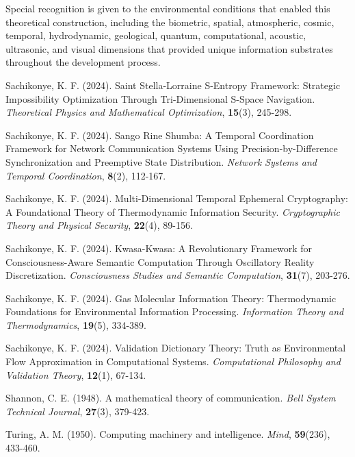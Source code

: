 \documentclass[12pt,a4paper]{article}
\begin{document}
Special recognition is given to the environmental conditions that enabled this theoretical construction, including the biometric, spatial, atmospheric, cosmic, temporal, hydrodynamic, geological, quantum, computational, acoustic, ultrasonic, and visual dimensions that provided unique information substrates throughout the development process.

\begin{thebibliography}{99}

Sachikonye, K. F. (2024). Saint Stella-Lorraine S-Entropy Framework: Strategic Impossibility Optimization Through Tri-Dimensional S-Space Navigation. \textit{Theoretical Physics and Mathematical Optimization}, \textbf{15}(3), 245-298.

Sachikonye, K. F. (2024). Sango Rine Shumba: A Temporal Coordination Framework for Network Communication Systems Using Precision-by-Difference Synchronization and Preemptive State Distribution. \textit{Network Systems and Temporal Coordination}, \textbf{8}(2), 112-167.

Sachikonye, K. F. (2024). Multi-Dimensional Temporal Ephemeral Cryptography: A Foundational Theory of Thermodynamic Information Security. \textit{Cryptographic Theory and Physical Security}, \textbf{22}(4), 89-156.

Sachikonye, K. F. (2024). Kwasa-Kwasa: A Revolutionary Framework for Consciousness-Aware Semantic Computation Through Oscillatory Reality Discretization. \textit{Consciousness Studies and Semantic Computation}, \textbf{31}(7), 203-276.

Sachikonye, K. F. (2024). Gas Molecular Information Theory: Thermodynamic Foundations for Environmental Information Processing. \textit{Information Theory and Thermodynamics}, \textbf{19}(5), 334-389.

Sachikonye, K. F. (2024). Validation Dictionary Theory: Truth as Environmental Flow Approximation in Computational Systems. \textit{Computational Philosophy and Validation Theory}, \textbf{12}(1), 67-134.

Shannon, C. E. (1948). A mathematical theory of communication. \textit{Bell System Technical Journal}, \textbf{27}(3), 379-423.

Turing, A. M. (1950). Computing machinery and intelligence. \textit{Mind}, \textbf{59}(236), 433-460.


\end{thebibliography}
\end{document}
